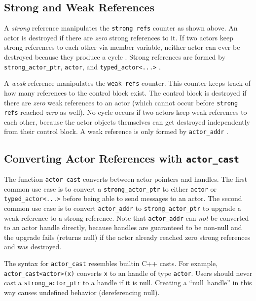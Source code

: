 \subsection{Strong and Weak References}

A \emph{strong} reference manipulates the \lstinline^strong refs^ counter as shown above. An actor is destroyed if there are \emph{zero} strong references to it. If two actors keep strong references to each other via member variable, neither actor can ever be destroyed because they produce a cycle . Strong references are formed by \lstinline^strong_actor_ptr^, \lstinline^actor^, and \lstinline^typed_actor<...>^ .

A \emph{weak} reference manipulates the \lstinline^weak refs^ counter. This counter keeps track of how many references to the control block exist. The control block is destroyed if there are \emph{zero} weak references to an actor (which cannot occur before \lstinline^strong refs^ reached \emph{zero} as well). No cycle occurs if two actors keep weak references to each other, because the actor objects themselves can get destroyed independently from their control block.  A weak reference is only formed by \lstinline^actor_addr^ .

\subsection{Converting Actor References with \texttt{actor\_cast}}
\label{actor-cast}

The function \lstinline^actor_cast^ converts between actor pointers and handles. The first common use case is to convert a \lstinline^strong_actor_ptr^ to either \lstinline^actor^ or \lstinline^typed_actor<...>^ before being able to send messages to an actor. The second common use case is to convert \lstinline^actor_addr^ to \lstinline^strong_actor_ptr^ to upgrade a weak reference to a strong reference. Note that \lstinline^actor_addr^ can \emph{not} be converted to an actor handle directly, because handles are guaranteed to be non-null and the upgrade fails (returns null) if the actor already reached zero strong references and was destroyed.

The syntax for \lstinline^actor_cast^ resembles builtin C++ casts. For example, \lstinline^actor_cast<actor>(x)^ converts \lstinline^x^ to an handle of type \lstinline^actor^. Users should never cast a \lstinline^strong_actor_ptr^ to a handle if it is null. Creating a ``null~handle'' in this way causes undefined behavior (dereferencing null).

